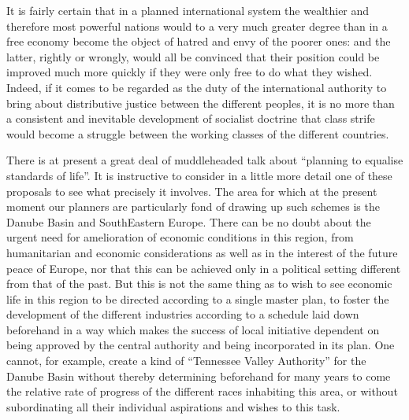 \documentclass[11pt,openany]{book}
\begin{document}
It is fairly certain that in a planned international system the wealthier and therefore most powerful nations would to a very much greater degree than in a free economy become the object of hatred and envy of the poorer ones: and the latter, rightly or wrongly, would all be convinced that their position could be improved much more quickly if they were only free to do what they wished. Indeed, if it comes to be regarded as the duty of the international authority to bring about distributive justice between the different peoples, it is no more than a consistent and inevitable development of socialist doctrine that class strife would become a struggle between the working classes of the different countries.

There is at present a great deal of muddleheaded talk about ``planning to equalise standards of life''. It is instructive to consider in a little more detail one of these proposals to see what precisely it involves. The area for which at the present moment our planners are particularly fond of drawing up such schemes is the Danube Basin and SouthEastern Europe. There can be no doubt about the urgent need for amelioration of economic conditions in this region, from humanitarian and economic considerations as well as in the interest of the future peace of Europe, nor that this can be achieved only in a political setting different from that of the past. But this is not the same thing as to wish to see economic life in this region to be directed according to a single master plan, to foster the development of the different industries according to a schedule laid down beforehand in a way which makes the success of local initiative dependent on being approved by the central authority and being incorporated in its plan. One cannot, for example, create a kind of ``Tennessee Valley Authority'' for the Danube Basin without thereby determining beforehand for many years to come the relative rate of progress of the different races inhabiting this area, or without subordinating all their individual aspirations and wishes to this task.
\end{document}
